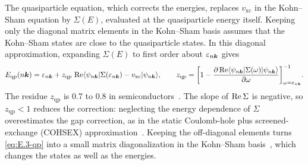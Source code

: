 The quasiparticle equation, which corrects the energies, replaces $v_{\mathrm{xc}}$ in the Kohn--Sham equation by $\Sigma(E)$, evaluated at the quasiparticle energy itself. Keeping only the diagonal matrix elements in the Kohn--Sham basis assumes that the Kohn--Sham states are close to the quasiparticle states. In this diagonal approximation, expanding $\Sigma(E)$ to first order about $\varepsilon_{n\bm{k}}$ gives~\cite[Eqs.~(57) and (58)]{aryasetiawan1998gw}
\begin{equation}
  E_{\mathrm{qp}}(n\bm{k}) = \varepsilon_{n\bm{k}} + z_{\mathrm{qp}}\,\operatorname{Re}\langle\psi_{n\bm{k}}|\Sigma(\varepsilon_{n\bm{k}}) - v_{\mathrm{xc}}|\psi_{n\bm{k}}\rangle, \qquad
  z_{\mathrm{qp}} = \biggl[1 - \frac{\partial\operatorname{Re}\langle\psi_{n\bm{k}}|\Sigma(\omega)|\psi_{n\bm{k}}\rangle}{\partial\omega}\biggr]^{-1}_{\omega = \varepsilon_{n\bm{k}}} .
  \label{eq:E.3-qp}
\end{equation}
The residue $z_{\mathrm{qp}}$ is 0.7 to 0.8 in semiconductors~\cite[Sect.~V\,B]{aryasetiawan1998gw}. The slope of $\operatorname{Re}\Sigma$ is negative, so $z_{\mathrm{qp}} < 1$ reduces the correction: neglecting the energy dependence of $\Sigma$ overestimates the gap correction, as in the static Coulomb-hole plus screened-exchange (COHSEX) approximation~\cite[Sect.~V\,B]{aryasetiawan1998gw}. Keeping the off-diagonal elements turns \cref{eq:E.3-qp} into a small matrix diagonalization in the Kohn--Sham basis~\cite[Eqs.~(17) and (18)]{deslippe2012berkeleygw}, which changes the states as well as the energies.

